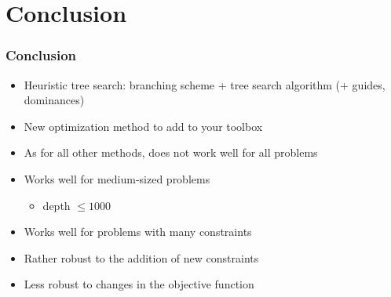 \documentclass[10pt]{beamer}
\begin{document}
\section{Conclusion}

\begin{frame}
  \frametitle{Conclusion}

  \begin{itemize}
    \item Heuristic tree search: branching scheme + tree search algorithm (+ guides, dominances)
    \item New optimization method to add to your toolbox
    \item As for all other methods, does not work well for all problems
    \item Works well for medium-sized problems
      \begin{itemize}
        \item depth $\le 1000$
      \end{itemize}
    \item Works well for problems with many constraints
    \item Rather robust to the addition of new constraints
    \item Less robust to changes in the objective function
  \end{itemize}
\end{frame}

\maketitle
\end{document}

